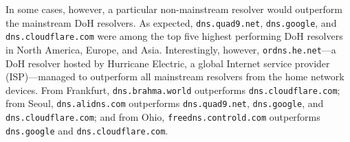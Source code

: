 In some cases, however, a particular non-mainstream resolver would outperform
the mainstream DoH resolvers.  As expected, \texttt{dns.quad9.net},
\texttt{dns.google}, and \texttt{dns.cloudflare.com} were among the top five
highest performing DoH resolvers in North America, Europe, and Asia.
Interestingly, however, \texttt{ordns.he.net}---a DoH resolver hosted by
Hurricane Electric, a global Internet service provider (ISP)---managed to
outperform all mainstream resolvers from the home network devices. From Frankfurt, \texttt{dns.brahma.world}
outperforms \texttt{dns.cloudflare.com}; from Seoul, \texttt{dns.alidns.com} outperforms \texttt{dns.quad9.net},
\texttt{dns.google}, and \texttt{dns.cloudflare.com}; and from Ohio, \texttt{freedns.controld.com} outperforms \texttt{dns.google}
and \texttt{dns.cloudflare.com}.

